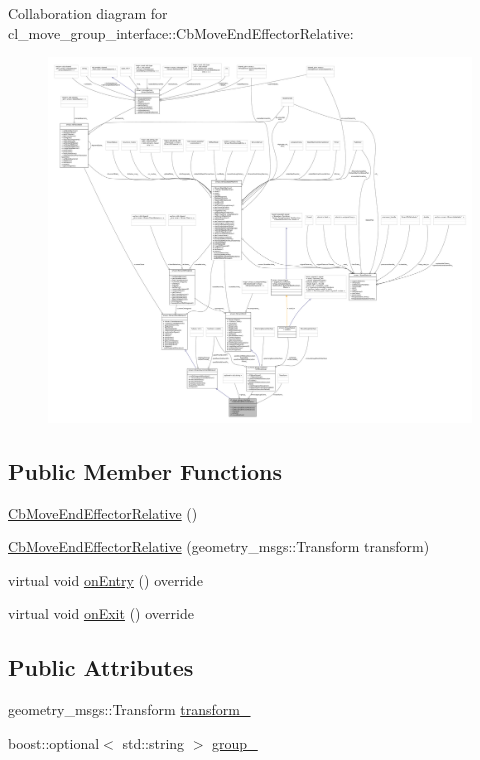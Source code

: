 Collaboration diagram for cl\+\_\+move\+\_\+group\+\_\+interface\+:\+:Cb\+Move\+End\+Effector\+Relative\+:
\nopagebreak
\begin{figure}[H]
\begin{center}
\leavevmode
\includegraphics[width=350pt]{classcl__move__group__interface_1_1CbMoveEndEffectorRelative__coll__graph}
\end{center}
\end{figure}
\subsection*{Public Member Functions}
\begin{DoxyCompactItemize}
\item 
\hyperlink{classcl__move__group__interface_1_1CbMoveEndEffectorRelative_ae19432476127e8dcfcd9066d86232fbd}{Cb\+Move\+End\+Effector\+Relative} ()
\item 
\hyperlink{classcl__move__group__interface_1_1CbMoveEndEffectorRelative_a3e3437f71b7cabff92f877273648e649}{Cb\+Move\+End\+Effector\+Relative} (geometry\+\_\+msgs\+::\+Transform transform)
\item 
virtual void \hyperlink{classcl__move__group__interface_1_1CbMoveEndEffectorRelative_a805a9d0f85ecdb1f503c1d6349ed9036}{on\+Entry} () override
\item 
virtual void \hyperlink{classcl__move__group__interface_1_1CbMoveEndEffectorRelative_a429a45cbde9b3b36c732958e9dd2811c}{on\+Exit} () override
\end{DoxyCompactItemize}
\subsection*{Public Attributes}
\begin{DoxyCompactItemize}
\item 
geometry\+\_\+msgs\+::\+Transform \hyperlink{classcl__move__group__interface_1_1CbMoveEndEffectorRelative_af17928d796ebd565451dd0ac216f0dc6}{transform\+\_\+}
\item 
boost\+::optional$<$ std\+::string $>$ \hyperlink{classcl__move__group__interface_1_1CbMoveEndEffectorRelative_a1bb9caf9c715a5d10ea38ab46c297adb}{group\+\_\+}
\end{DoxyCompactItemize}
